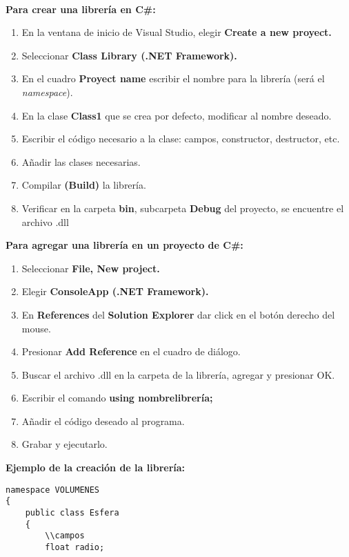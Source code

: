 \documentclass[letterpaper, 12pt]{article}
\begin{document}
\begin{justify}
            \textbf{\\Para crear una librería en C\#:}
            \begin{enumerate}
                \item En la ventana de inicio de Visual Studio, elegir \textbf{Create a new proyect.}
                \item Seleccionar \textbf{Class Library (.NET Framework).}
                \item En el cuadro \textbf{Proyect name} escribir el nombre para la librería (será el \emph{namespace}).
                \item En la clase \textbf{Class1} que se crea por defecto, modificar al nombre deseado.
                \item Escribir el código necesario a la clase: campos, constructor, destructor, etc.
                \item Añadir las clases necesarias.
                \item Compilar \textbf{(Build)} la librería.
                \item Verificar en la carpeta \textbf{bin}, subcarpeta \textbf{Debug} del proyecto, se encuentre el archivo .dll
            \end{enumerate}
            \textbf{Para agregar una librería en un proyecto de C\#:}
            \begin{enumerate}
                \item Seleccionar \textbf{File, New project.}
                \item Elegir \textbf{ConsoleApp (.NET Framework).}
                \item En \textbf{References} del \textbf{Solution Explorer} dar click en el botón derecho del mouse.
                \item Presionar \textbf{Add Reference} en el cuadro de diálogo.
                \item Buscar el archivo .dll en la carpeta de la librería, agregar y presionar OK.
                \item Escribir el comando \textbf{using nombrelibrería;}
                \item Añadir el código deseado al programa.
                \item Grabar y ejecutarlo.
            \end{enumerate}
            \textbf{Ejemplo de la creación de la librería:}
                \begin{verbatim}
namespace VOLUMENES
{
    public class Esfera
    {
        \\campos
        float radio;


\end{verbatim}
\end{justify}
\end{document}
